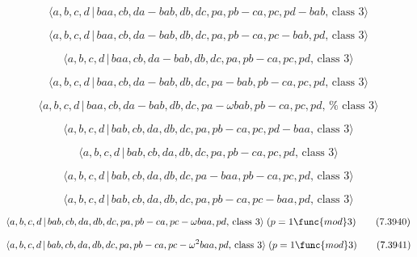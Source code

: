 \documentclass[10pt]{article}
\begin{document}
\begin{equation}
\langle a,b,c,d\,|\,baa,cb,da-bab,db,dc,pa,pb-ca,pc,pd-bab,\,\text{class }%
3\rangle  \tag{7.3931}
\end{equation}

\begin{equation}
\langle a,b,c,d\,|\,baa,cb,da-bab,db,dc,pa,pb-ca,pc-bab,pd,\,\text{class }%
3\rangle  \tag{7.3932}
\end{equation}

\begin{equation}
\langle a,b,c,d\,|\,baa,cb,da-bab,db,dc,pa,pb-ca,pc,pd,\,\text{class }%
3\rangle  \tag{7.3933}
\end{equation}

\begin{equation}
\langle a,b,c,d\,|\,baa,cb,da-bab,db,dc,pa-bab,pb-ca,pc,pd,\,\text{class }%
3\rangle  \tag{7.3934}
\end{equation}

\begin{equation}
\langle a,b,c,d\,|\,baa,cb,da-bab,db,dc,pa-\omega bab,pb-ca,pc,pd,\,\text{%
class }3\rangle  \tag{7.3935}
\end{equation}

\begin{equation}
\langle a,b,c,d\,|\,bab,cb,da,db,dc,pa,pb-ca,pc,pd-baa,\,\text{class }%
3\rangle  \tag{7.3936}
\end{equation}

\begin{equation}
\langle a,b,c,d\,|\,bab,cb,da,db,dc,pa,pb-ca,pc,pd,\,\text{class }3\rangle 
\tag{7.3937}
\end{equation}

\begin{equation}
\langle a,b,c,d\,|\,bab,cb,da,db,dc,pa-baa,pb-ca,pc,pd,\,\text{class }%
3\rangle  \tag{7.3938}
\end{equation}

\begin{equation}
\langle a,b,c,d\,|\,bab,cb,da,db,dc,pa,pb-ca,pc-baa,pd,\,\text{class }%
3\rangle  \tag{7.3939}
\end{equation}

\begin{equation}
\langle a,b,c,d\,|\,bab,cb,da,db,dc,pa,pb-ca,pc-\omega baa,pd,\,\text{class }%
3\rangle \;(p=1\func{mod}3)  \tag{7.3940}
\end{equation}

\begin{equation}
\langle a,b,c,d\,|\,bab,cb,da,db,dc,pa,pb-ca,pc-\omega ^{2}baa,pd,\,\text{%
class }3\rangle \;(p=1\func{mod}3)  \tag{7.3941}
\end{equation}
\end{document}
